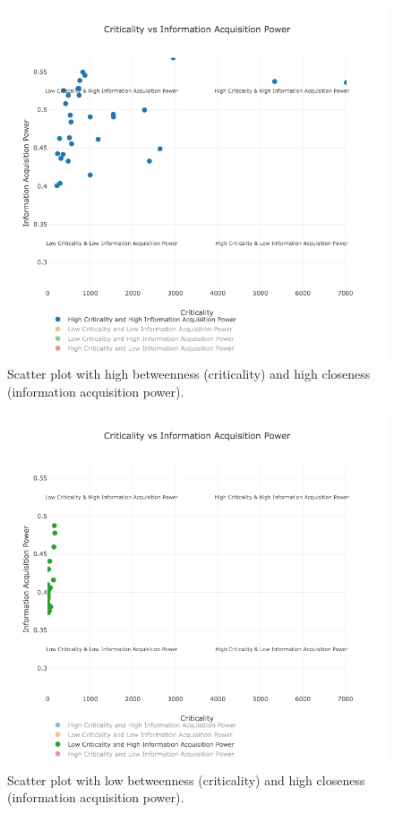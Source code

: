 \documentclass[conference]{IEEEtran}
\begin{document}
\begin{figure}[ht!]
  \includegraphics[width=\linewidth]{scatterplot_blue.png}
  \caption{Scatter plot with high betweenness (criticality) and high closeness (information acquisition power).}
  \label{fig:scatterplot_hbhc}
\end{figure}

\begin{figure}[ht!]
  \includegraphics[width=\linewidth]{scatterplot_green.png}
  \caption{Scatter plot with low betweenness (criticality) and high closeness (information acquisition power).}
  \label{fig:scatterplot_lbhc}
\end{figure}
\end{document}
